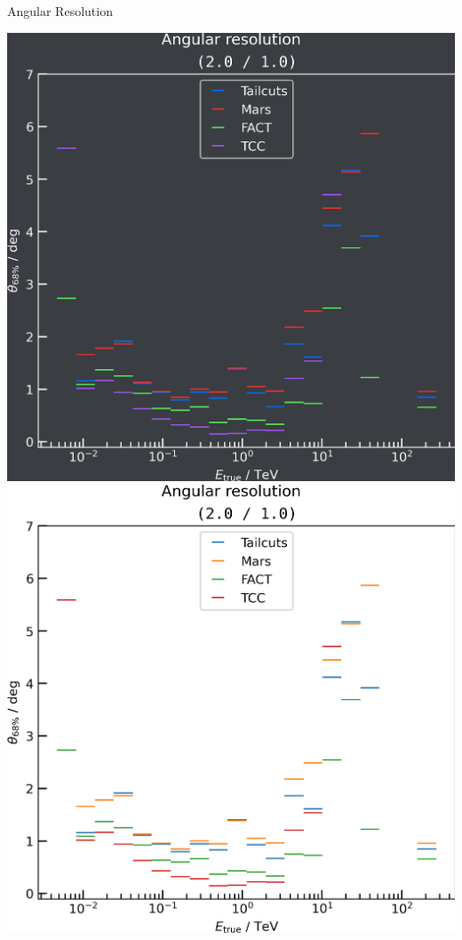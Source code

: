 \begin{frame}{Angular Resolution}
  \begin{minipage}{0.32\textwidth}
    \ifdefined\darktheme
      \centering
      \includegraphics[width=\textwidth]{plots/ang_res/ang_res_2.0_1.0_dark.png}
    \else
      \includegraphics[width=\textwidth]{plots/ang_res/ang_res_2.0_1.0_light.png}

\end{minipage}
\end{frame}
